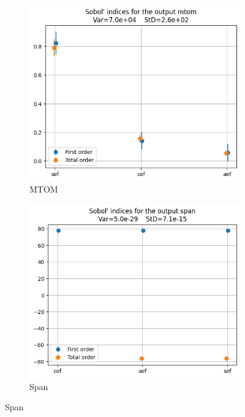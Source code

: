 \documentclass[a4paper, 11pt]{article}
\begin{document}
\begin{figure}[H]
    \centering
    \begin{subfigure}[b]{0.45\textwidth}
        \includegraphics[width=\textwidth]{Images_Ayoub/Problem2/UseCase1/Sobol_Indices/mtom.png}
        \caption{MTOM}
        \label{fig:mtom}
    \end{subfigure}
    \hfill
    \begin{subfigure}[b]{0.45\textwidth}
        \includegraphics[width=\textwidth]{Images_Ayoub/Problem2/UseCase1/Sobol_Indices/span.png}
        \caption{Span}
        \label{fig:span}
    \end{subfigure}


\end{figure}
\end{document}
